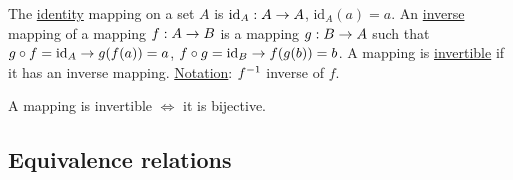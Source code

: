 \documentclass[]{article}
\begin{document}
\begin{definition}
	The \ul{identity} mapping on a set $A$ is $\text{id}_A: A\rightarrow A$, $\text{id}_A(a) = a$.
	An \ul{inverse} mapping of a mapping $f:A\rightarrow B$ is a mapping $g:B\rightarrow A$ such that $g\circ f = \text{id}_A \rightarrow g(f(a)) = a$, $f\circ g = \text{id}_B \rightarrow f(g(b)) = b$.
	A mapping is \ul{invertible} if it has an inverse mapping. \ul{Notation}: $f^{-1}$ inverse of $f$.
\end{definition}

\begin{theorem}
	A mapping is invertible $\Leftrightarrow$ it is bijective.
\end{theorem}

\subsection*{Equivalence relations}
\end{document}
